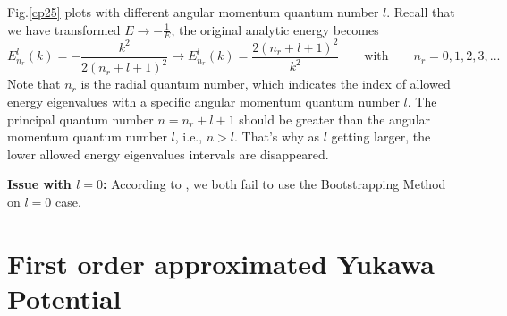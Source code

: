 \documentclass[10pt]{article}
\begin{document}
Fig.\ref{cp25} plots with different angular momentum quantum number $l$. Recall that we have transformed $E\rightarrow -\frac{1}{E}$, the original analytic energy becomes
\begin{equation}
    E^l_{n_r}(k)=-\frac{k^2}{2(n_r+l+1)^2} \longrightarrow E^l_{n_r}(k)=\frac{2(n_r+l+1)^2}{k^2}
    \qquad \text{with} \qquad n_r=0,1,2,3,...
\end{equation}
Note that $n_r$ is the radial quantum number, which indicates the index of allowed energy eigenvalues with a specific angular momentum quantum number $l$. The principal quantum number $n=n_r+l+1$ should be greater than the angular momentum quantum number $l$, i.e., $n>l$. That's why as $l$ getting larger, the lower allowed energy eigenvalues intervals are disappeared.

\textbf{Issue with $l=0$:} According to \cite{berenstein2021bootstrapping}, we both fail to use the Bootstrapping Method on $l=0$ case.

\section{First order approximated Yukawa Potential}\label{sec:4}
\end{document}
